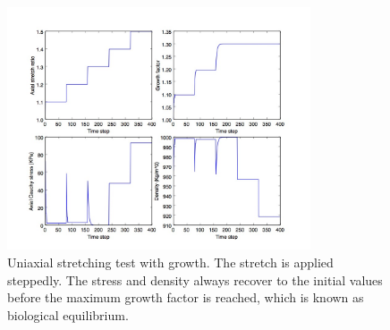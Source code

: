 \documentclass[12pt]{article}
\begin{document}
\begin{figure}[H]
	\centering
	\includegraphics[width=0.8\textwidth]{./figs/stretch.jpg}
	\caption{Uniaxial stretching test with growth. The stretch is applied steppedly. The stress and density always recover to the initial values before the maximum growth factor is reached, which is known as biological equilibrium.}
	\label{fig:growth_results}
\end{figure}
\end{document}
